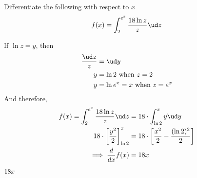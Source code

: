 

\question[2] Differentiate the following with respect to $x$
\[ f(x) = \int_2^{e^x}\dfrac{\va\ln z}{z}\ud z\] 

\watchout

\begin{solution}[\halfpage]
  If $\ln z = y$, then
	\begin{align}
		\dfrac{\ud z}{z} &= \ud y \\
		y &= \ln 2 \text{ when } z = 2 \\
		y &= \ln e^x = x \text{ when } z = e^x
	\end{align}
	And therefore,
	\begin{align}
		f(x) = \int_2^{e^x}\dfrac{\va\ln z}{z}\ud z &= \va\cdot\int_{\ln 2}^{x} y \ud y \\
		\va\cdot\left[ \dfrac{y^2}{2}\right]_{\ln 2}^{x} &= \va\cdot\left[\dfrac{x^2}{2} - \dfrac{(\ln 2)^2}{2}\right] \\
		\implies \dfrac{d}{dx}f(x) &= \va x
	\end{align}
\end{solution}

\ifprintanswers\begin{codex}$18 x$\end{codex}\fi
